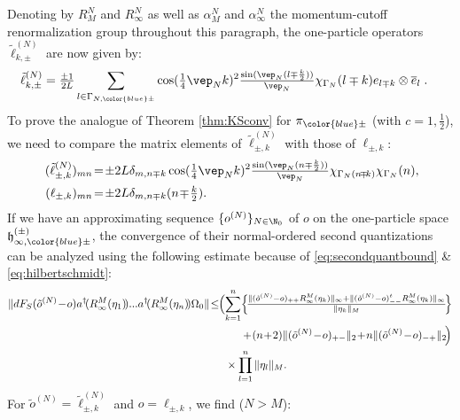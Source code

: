 \documentclass[a4paper, 11pt]{article}
\newcommand{\fh}{\mathfrak{h}}
\DeclareMathOperator{\1}{\mathds{1}}
\begin{document}
\bigskip

Denoting by $R^{N}_{M}$ and $R^{N}_{\infty}$ as well as $\alpha^{N}_{M}$ and $\alpha^{N}_{\infty}$ the momentum-cutoff renormalization group throughout this paragraph, the one-particle operators $\tilde{\ell}^{(N)}_{k,\pm}$ are now given by:
\begin{align}
\label{eq:latvirachi1pmom}
\tilde{\ell}^{(N)}_{k,\pm} & = \tfrac{\pm1}{2L}\sum_{l\in\Gamma_{N,{\color{blue}\pm}}} \cos(\tfrac{1}{4}\vep_{N}k)^{2}\tfrac{\sin(\vep_{N}(l\mp\frac{k}{2}))}{\vep_{N}}\chi_{\Gamma_{N}}(l\mp k)e_{l\mp k}\otimes \overline{e}_{l}\;.
\end{align}
To prove the analogue of Theorem \ref{thm:KSconv} for $\pi_{{\color{blue}\pm}}$ (with $c=1,\tfrac{1}{2}$), we need to compare the matrix elements of $\tilde{\ell}^{(N)}_{\pm,k}$ with those of $\ell_{\pm,k}$:
\begin{align}
\label{eq:latvirachi1pmommat}
(\tilde{\ell}^{(N)}_{\pm,k})_{mn} &\!=\!\pm2L\delta_{m,n\mp k}\cos(\tfrac{1}{4}\vep_{N}k)^{2}\tfrac{\sin(\vep_{N}(n\mp\frac{k}{2}))}{\vep_{N}}\chi_{\Gamma_{N}(n\!\mp\!k)}\chi_{\Gamma_{N}}(n), \\ \nonumber
(\ell_{\pm,k})_{mn} &\!=\!\pm2L\delta_{m,n\mp k}(n\!\mp\!\tfrac{k}{2}).
\end{align}
If we have an approximating sequence $\{o^{(N)}\}_{N\in\N_{0}}$ of $o$ on the one-particle space $\fh^{(\pm)}_{\infty,{\color{blue}\pm}}$, the convergence of their normal-ordered second quantizations can be analyzed using the following estimate because of \eqref{eq:secondquantbound} \& \eqref{eq:hilbertschmidt}:
\begin{align}
\label{eq:noquantconv} \nonumber
\|dF_{S}(\tilde{o}^{(N)}\!-\!o)a^{\dag}\!(R^{M}_{\infty}(\eta_{1})\!)...a^{\dag}\!(R^{M}_{\infty}(\eta_{n})\!)\Omega_{0}\| &\!\leq\!\!\Big(\!\sum_{k=1}^{n}\!\Big\{\!\tfrac{\|(\tilde{o}^{(N)} - o)_{++}R^{M}_{\infty}(\eta_{k})\|_{\infty}+\|(\tilde{o}^{(N)} - o)^{t}_{- -}R^{M}_{\infty}(\eta_{k})\|_{\infty}}{\|\eta_{k}\|_{M}}\!\Big\} \\ \nonumber
 & \hspace{1cm} +\!(n\!+\!2)\|(\tilde{o}^{(N)}\!-\!o)_{+-}\|_{2}\!+\!n\|(\tilde{o}^{(N)}\!-\!o)_{-+}\|_{2}\!\Big) \\
 & \hspace{0.5cm} \times \prod_{l=1}^{n}\|\eta_{l}\|_{M}.
\end{align}
For $\tilde{o}^{(N)}=\tilde{\ell}^{(N)}_{\pm,k}$ and $o = \ell_{\pm,k}$, we find ($N>M$):
\end{document}
